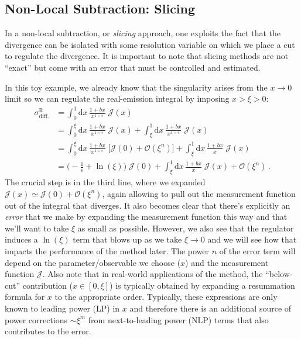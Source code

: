 \documentclass[11pt]{article}
\begin{document}
\subsection{Non-Local Subtraction: Slicing}
\label{sec:orga329538}
In a non-local subtraction, or \emph{slicing} approach, one exploits the fact that the divergence can be isolated with some resolution variable on which we place a cut to regulate the divergence.
It is important to note that slicing methods are not ``exact'' but come with an error that must be controlled and estimated.

In this toy example, we already know that the singularity arises from the \(x\to0\) limit so we can regulate the real-emission integral by imposing \(x > \xi > 0\):
\begin{align}
  \sigma^\mathrm{R}_\mathrm{diff.}
  &=
  \int_0^1\mathrm{d}x\,\frac{1+bx}{x^{1+\epsilon}}
  \;\mathcal{J}(x)
  \nonumber\\&=
  \int_0^\xi\mathrm{d}x\,\frac{1+bx}{x^{1+\epsilon}}
  \;\mathcal{J}(x) +
  \int_\xi^1\mathrm{d}x\,\frac{1+bx}{x^{1+\epsilon}}
  \;\mathcal{J}(x)
  \nonumber\\&=
  \int_0^\xi\mathrm{d}x\,\frac{1+bx}{x^{1+\epsilon}}
  \;\Big[\mathcal{J}(0) + \mathcal{O}(\xi^n)\Bigr]
  +\int_\xi^1\mathrm{d}x\,\frac{1+bx}{x}
  \;\mathcal{J}(x)
  \nonumber\\&=
  \biggl( -\frac{1}{\epsilon} + \ln(\xi) \biggr) \;\mathcal{J}(0)
  +\int_\xi^1\mathrm{d}x\,\frac{1+bx}{x}
  \;\mathcal{J}(x)
  + \mathcal{O}(\xi^n)
  \,.
\end{align}
The crucial step is in the third line, where we expanded \(\mathcal{J}(x) \simeq \mathcal{J}(0) + \mathcal{O}(\xi^n)\), again allowing to pull out the measurement function out of the integral that diverges.
It also becomes clear that there's explicitly an \emph{error} that we make by expanding the measurement function this way and that we'll want to take \(\xi\) as small as possible.
However, we also see that the regulator induces a \(\ln(\xi)\) term that blows up as we take \(\xi\to0\) and we will see how that impacts the performance of the method later.
The power \(n\) of the error term will depend on the parameter/observable we choose (\(x\)) and the measurement function \(\mathcal{J}\).
Also note that in real-world applications of the method, the ``below-cut'' contribution (\(x\in[0,\xi]\)) is typically obtained by expanding a resummation formula for \(x\) to the appropriate order.
Typically, these expressions are only known to leading power (LP) in \(x\) and therefore there is an additional source of power corrections \(\sim\xi^m\) from next-to-leading power (NLP) terms that also contributes to the error.
\end{document}
